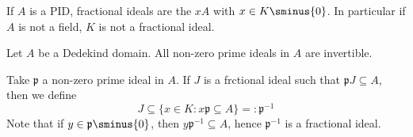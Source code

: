 \begin{example}{}
    If \(A\) is a PID, fractional ideals are the \(xA\) with \(x \in K \sminus
    \{0\} \). In particular if \(A\) is not a field, \(K\) is not a fractional
    ideal.
\end{example}

\begin{theorem}{}
    Let \(A\) be a Dedekind domain. All non-zero prime ideals in \(A\) are
    invertible.
\end{theorem}
Take \(\mathfrak{p}\) a non-zero prime ideal in \(A\). If \(J\) is a frctional
ideal such that \(\mathfrak{p}J \subseteq A \), then we define
\[
  J \subseteq \{ x \in  K : x \mathfrak{p} \subseteq A \} =: \mathfrak{p}^{-1}  
\]
Note that if \(y \in  \mathfrak{p} \sminus \{0\} \), then \(y\mathfrak{p}^{-1}
\subseteq A \), hence \(\mathfrak{p}^{-1}\) is a fractional ideal.

